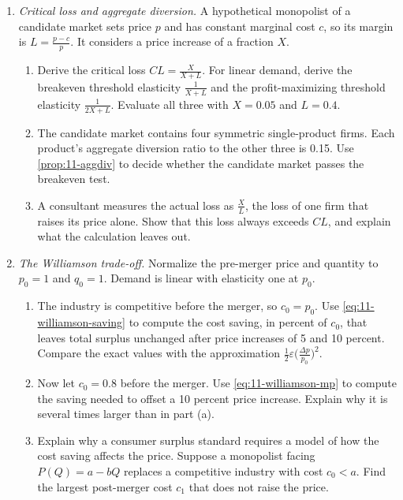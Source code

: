 \begin{enumerate}[label=\arabic*., leftmargin=*, itemsep=6pt]

\item \emph{Critical loss and aggregate diversion.} A hypothetical monopolist of a candidate market sets price $p$
and has constant marginal cost $c$, so its margin is $L = \frac{p - c}{p}$. It considers a price increase of a
fraction $X$.
\begin{enumerate}[label=(\alph*)]
\item Derive the critical loss $\mathit{CL} = \frac{X}{X + L}$. For linear demand, derive the breakeven threshold
elasticity $\frac{1}{X + L}$ and the profit-maximizing threshold elasticity $\frac{1}{2X + L}$. Evaluate all three with
$X = 0.05$ and $L = 0.4$.
\item The candidate market contains four symmetric single-product firms. Each product's aggregate diversion ratio to
the other three is 0.15. Use \cref{prop:11-aggdiv} to decide whether the candidate market passes the breakeven test.
\item A consultant measures the actual loss as $\frac{X}{L}$, the loss of one firm that raises its price alone. Show
that this loss always exceeds $\mathit{CL}$, and explain what the calculation leaves out.
\end{enumerate}

\item \emph{The Williamson trade-off.} Normalize the pre-merger price and quantity to $p_0 = 1$ and $q_0 = 1$. Demand
is linear with elasticity one at $p_0$.
\begin{enumerate}[label=(\alph*)]
\item The industry is competitive before the merger, so $c_0 = p_0$. Use \eqref{eq:11-williamson-saving} to compute
the cost saving, in percent of $c_0$, that leaves total surplus unchanged after price increases of 5 and 10 percent.
Compare the exact values with the approximation $\frac{1}{2}\varepsilon\big(\frac{\Delta p}{p_0}\big)^2$.
\item Now let $c_0 = 0.8$ before the merger. Use \eqref{eq:11-williamson-mp} to compute the saving needed to offset a
10 percent price increase. Explain why it is several times larger than in part (a).
\item Explain why a consumer surplus standard requires a model of how the cost saving affects the price. Suppose a
monopolist facing $P(Q) = a - bQ$ replaces a competitive industry with cost $c_0 < a$. Find the largest post-merger
cost $c_1$ that does not raise the price.
\end{enumerate}


\end{enumerate}

